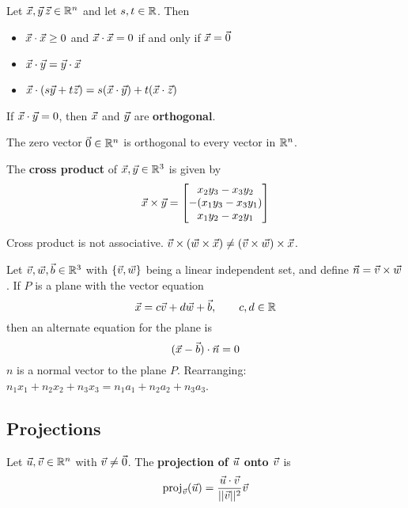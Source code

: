 \documentclass[english, 12pt]{article}
\begin{document}
\begin{thrm}
Let $\vec{x},\vec{y}\,\vec{z} \in {\mathbb{R}}^n$ and let $s,t \in {\mathbb{R}}$. Then
\begin{itemize}
\item $\vec{x} \cdot \vec{x} \geq 0$ and $\vec{x} \cdot \vec{x} = 0$ if and only if $\vec{x} = \vec{0}$
\item $\vec{x} \cdot \vec{y} = \vec{y} \cdot \vec{x}$
\item $\vec{x} \cdot (s\vec{y} + t \vec{z}) = s (\vec{x} \cdot \vec{y}) + t (\vec{x} \cdot \vec{z})$
\end{itemize}
\end{thrm}

\begin{thrm}
If $\vec{x} \cdot \vec{y} = 0$, then $\vec{x}$ and $\vec{y}$ are \textbf{orthogonal}.
\end{thrm}
\begin{qte}
The zero vector $\vec{0} \in {\mathbb{R}}^n$ is orthogonal to every vector in ${\mathbb{R}}^n$.
\end{qte}

\begin{thrm}
The \textbf{cross product} of $\vec{x},\vec{y} \in {\mathbb{R}}^3$ is given by
\[\vec{x} \times \vec{y} =
\begin{bmatrix}
x_{2}y_{3} - x_{3} y_{2} \\
- (x_{1} y_{3} - x_{3} y_{1}) \\
x_{1} y_{2} - x_{2} y_{1}
\end{bmatrix}\]
\end{thrm}

\begin{qte}
Cross product is not associative. $\vec{v} \times (\vec{w} \times \vec{x}) \neq (\vec{v} \times \vec{w}) \times \vec{x}$.
\end{qte}

\begin{thrm}
Let $\vec{v},\vec{w}, \vec{b} \in {\mathbb{R}}^3$ with $\{\vec{v},\vec{w}\}$ being a linear independent set, and define $\vec{n} = \vec{v} \times \vec{w}$. If $P$ is a plane with the vector equation
\[ \vec{x} = c \vec{v} + d \vec{w} + \vec{b}, \qquad c,d \in {\mathbb{R}}\]
then an alternate equation for the plane is
\[(\vec{x} - \vec{b}) \cdot \vec{n} = 0\]
$n$ is a normal vector to the plane $P$.
Rearranging: $n_{1} x_{1} + n_{2} x_{2} + n_{3} x_{3} = n_{1} a_{1} + n_{2} a_{2} + n_{3} a_{3}$.
\end{thrm}

\subsection{Projections}
\begin{defn}
Let $\vec{u},\vec{v} \in {\mathbb{R}}^n$ with $\vec{v} \neq \vec{0}$. The \textbf{projection of $\vec{u}$ onto $\vec{v}$} is
\[\operatorname{proj}_{\vec{v}} (\vec{u}) = \frac{\vec{u} \cdot \vec{v}}{||\vec{v}||^2} \vec{v}\]
\end{defn}
\end{document}

